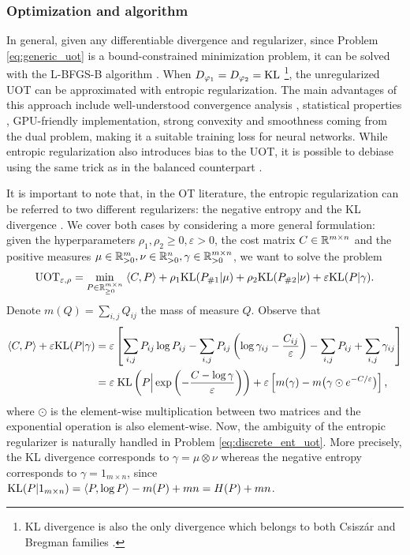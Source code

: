 \subsubsection{Optimization and algorithm} \label{sub:uot_optim}

In general, given any differentiable divergence and regularizer, since Problem \eqref{eq:generic_uot}
is a bound-constrained minimization problem, it can be solved with the L-BFGS-B algorithm
\citep{Byrd95,Zhu97}. When $D_{\varphi_1} = D_{\varphi_2} = \text{KL}$
\footnote{KL divergence is also the only divergence which belongs to both Csiszár and
Bregman families \citep{Jiantao14}.}, the unregularized UOT can
be approximated with entropic regularization. The main advantages of this approach include
well-understood convergence analysis \citep{Chizat18a}, statistical properties \citep{Sejourne19},
GPU-friendly implementation, strong convexity and smoothness coming from the dual problem,
making it a suitable training loss for neural networks.
While entropic regularization also introduces bias to the UOT, it is possible to debiase
using the same trick as in the balanced counterpart \citep{Sejourne19}.

It is important to note that, in the OT literature, the entropic regularization
can be referred to two different regularizers: the negative entropy \citep{Frogner15, Chizat18a} and
the KL divergence \citep{Sejourne19}. We cover both cases by considering a
more general formulation: given the hyperparameters
$\rho_1, \rho_2 \geq 0, \varepsilon > 0$, the cost matrix $C \in \mathbb R^{m \times n}$
and the positive measures $\mu \in \mathbb R^m_{> 0}, \nu \in \mathbb R^n_{> 0}, \gamma \in \mathbb R^{m \times n}_{> 0}$,
we want to solve the problem
\begin{align}
  \label{eq:discrete_ent_uot}
  \text{UOT}_{\varepsilon, \rho} = \min_{P \in \mathbb R^{m \times n}_{\geq 0}}
  \; \langle C, P \rangle + \rho_1 \text{KL}(P_{\# 1} | \mu)
  + \rho_2 \text{KL}(P_{\# 2} | \nu) + \varepsilon \text{KL}(P | \gamma).
\end{align}
Denote $m(Q) = \sum_{i, j} Q_{ij}$ the mass of measure $Q$. Observe that
\begin{align}
  \langle C, P \rangle + \varepsilon \text{KL}(P | \gamma) &=
  \varepsilon \left[ \sum_{i, j} P_{ij} \log P_{ij} -
  \sum_{i, j} P_{ij} \left( \log \gamma_{ij} - \frac{C_{ij}}{\varepsilon} \right)
  - \sum_{i, j} P_{ij} + \sum_{i, j} \gamma_{ij} \right] \\
  &= \varepsilon \; \text{KL} \left(P \Big| \exp \left( -\frac{C - \log \gamma}{\varepsilon} \right) \right)
  + \varepsilon \left[ m(\gamma) - m \big(\gamma \odot e^{-C / \varepsilon} \big) \right],
\end{align}
where $\odot$ is the element-wise multiplication between two matrices and the exponential operation
is also element-wise. Now, the ambiguity of the entropic regularizer is naturally handled in
Problem \eqref{eq:discrete_ent_uot}. More precisely,
the KL divergence corresponds to $\gamma = \mu \otimes \nu$ whereas
the negative entropy corresponds to $\gamma = 1_{m \times n}$,
since $\text{KL}(P | 1_{m \times n}) = \langle P, \log P \rangle - m(P) + mn = H(P) + mn$.

